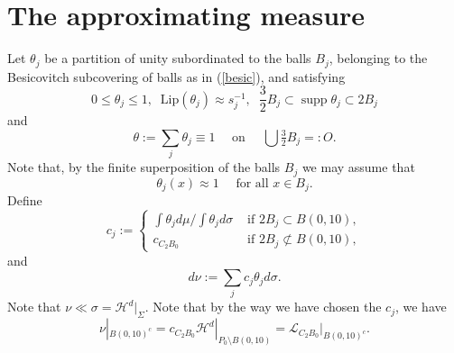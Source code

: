 \documentclass[11pt]{amsart}
\newcommand{\LL}{{\mathcal L}}
\newcommand{\rf}[1]{{(\ref{#1})}}
\newcommand{\supp}{\operatorname{supp}}
\newcommand{\vv}{{\vspace{2mm}}}
\theoremstyle{definition}
\theoremstyle{remark}
\numberwithin{equation}{section}
\def\cH{{\mathcal{H}}}
\newcommand{\isif}[1]{\left\{\begin{array}{cc} #1
\end{array}\right.}
\def\Lip{\textrm{Lip}}
\newcommand{\jonas}[1]{}%
\begin{document}
\vv

 
\section{The approximating measure}\label{meas-approx}

Let $\theta_{j}$ be a partition of unity subordinated to the balls $B_{j}$, belonging to the Besicovitch subcovering of balls as in \rf{besic}, and satisfying
\begin{equation}\label{partition1}
0\leq \theta_{j} \leq 1 , \;\;
\Lip(\theta_{j})\approx s_{j}^{-1}, \;\; 
\frac{3}{2}B_j\subset\supp \theta_{j}\subset 2B_{j}
\end{equation}
and
\begin{equation}\label{partition2}
\theta:=\sum_{j} \theta_{j} \equiv 1\quad \mbox{ on } \quad\bigcup \tfrac{3}{2}B_{j}=: O.
\end{equation}
Note that, by the finite superposition of the balls $B_j$ we may assume that 
$$\theta_j(x)\approx 1\quad\mbox{ for all $x\in B_j$.}$$
Define 
\begin{equation}
\label{e:cj}
 c_{j}:= \isif{ \int \theta_{j} d\mu/\int \theta_{j}d\sigma & \mbox{ if } 2B_{j}\subset  B(0,10), \\ c_{C_{2} B_{0}} & \mbox{ if } 2B_{j}\not\subset B(0,10),}
\end{equation}
and
\begin{equation}\label{def-nu}
d\nu := \sum_{j} c_{j}\theta_{j} d\sigma.
\end{equation}
Note that $\nu\ll  \sigma=\cH^d|_{\Sigma}$.
Note that by the way we have chosen the $c_{j}$, we have 
\begin{equation}\label{e:nuaway}
\nu|_{B(0,10)^{c}}= c_{C_{2}B_{0}} \cH^{d}|_{P_{0}\setminus B(0,10)} = \LL_{C_{2}B_{0}}|_{B(0,10)^{c}}.
\end{equation}
%
\end{document}
